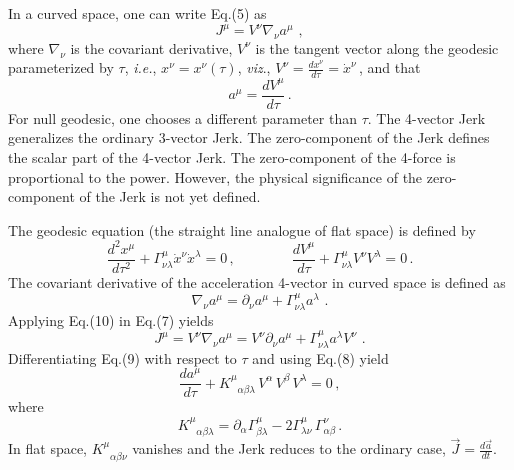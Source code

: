 \documentclass[a4]{epl2}
\begin{document}
In a curved space, one can write Eq.(5) as
\begin{equation}
J^{\mu}=V^\nu\nabla_\nu  a^\mu\, \,,
\end{equation}
where $\nabla_\nu$ is the covariant derivative, $V^\nu$ is the tangent vector along the geodesic parameterized by $\tau$, \emph{i.e.}, $x^\nu=x^\nu(\tau)$, \emph{viz}., $V^\nu=\frac{dx^\nu}{d\tau}=\dot x^\nu$\,, and that
\begin{equation}
a^\mu=\frac{dV^\mu}{d\tau}\,.
\end{equation}
For null geodesic, one chooses a different parameter than $\tau$. The 4-vector Jerk generalizes the ordinary 3-vector Jerk. The zero-component of the Jerk defines the scalar part of the 4-vector Jerk.  The zero-component of the 4-force  is proportional to the power. However, the physical significance of the zero-component of the Jerk is not yet defined.

The geodesic equation (the straight line analogue of flat space) is defined by
\begin{equation}
\frac{d^2x^\mu}{d\tau^2}+\Gamma^\mu_{\nu\lambda}\dot x^\nu \dot x^\lambda=0\,,\qquad \qquad \frac{dV^\mu}{d\tau}+\Gamma^\mu_{\nu\lambda}V^\nu V^\lambda=0 \,.
\end{equation}
The covariant derivative of the acceleration 4-vector in curved space is defined as
\begin{equation}
\nabla_\nu  a^\mu=\partial_\nu a^\mu+\Gamma^\mu_{\nu\lambda}a^\lambda\, \,.
\end{equation}
Applying Eq.(10) in Eq.(7) yields
\begin{equation}
J^{\mu}=V^\nu\nabla_\nu  a^\mu=V^\nu\partial_\nu a^\mu+\Gamma^\mu_{\nu\lambda}a^\lambda V^\nu\, \,.
\end{equation}
Differentiating Eq.(9) with respect to $\tau$ and using Eq.(8) yield
\begin{equation}
\frac{da^\mu}{d\tau}+K^\mu_{\,\,\,\,\alpha\beta\lambda}\, V^\alpha\,V^\beta\, V^\lambda=0\,,
\end{equation}
where
\begin{equation}
K^\mu_{\,\,\,\,\alpha\beta\lambda}=\partial_\alpha\Gamma^\mu_{\beta\lambda}-2\Gamma^\mu_{\lambda\nu}\,\Gamma^\nu_{\alpha\beta}\,.
\end{equation}
In flat space, $K^\mu_{\,\,\,\,\alpha\beta\nu}$ vanishes and the Jerk reduces to the ordinary case, $\vec{J}=\frac{d\vec{a}}{dt}$.
\end{document}
